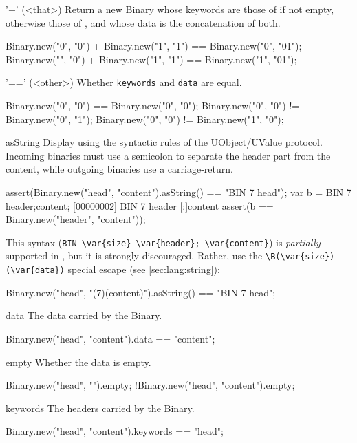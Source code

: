 \begin{urbiscriptapi}
\item['+'](<that>)%
  Return a new Binary whose keywords are those of \this if
  not empty, otherwise those of , and whose data is the
  concatenation of both.
\begin{urbiassert}
Binary.new("0", "0") + Binary.new("1", "1")
       == Binary.new("0", "01");
Binary.new("", "0") + Binary.new("1", "1")
       == Binary.new("1", "01");
\end{urbiassert}


\item['=='](<other>)%
  Whether \lstinline|keywords| and \lstinline|data| are equal.
\begin{urbiassert}
Binary.new("0", "0") == Binary.new("0", "0");
Binary.new("0", "0") != Binary.new("0", "1");
Binary.new("0", "0") != Binary.new("1", "0");
\end{urbiassert}


\item[asString]
  Display using the syntactic rules of the UObject/UValue protocol.
  Incoming binaries must use a semicolon to separate the header part
  from the content, while outgoing binaries use a carriage-return.
\begin{urbiscript}
assert(Binary.new("head", "content").asString()
       == "BIN 7 head\ncontent");
var b = BIN 7 header;content;
[00000002] BIN 7 header
[:]content
assert(b == Binary.new("header", "content"));
\end{urbiscript}

This syntax (\lstinline|BIN \var{size} \var{header}; \var{content}|)
is \emph{partially} supported in \us, but it is strongly discouraged.
Rather, use the \lstinline|\B(\var{size})(\var{data})| special escape
(see \autoref{sec:lang:string}):

\begin{urbiassert}
Binary.new("head", "\B(7)(content)").asString()
       == "BIN 7 head\ncontent";
\end{urbiassert}


\item[data]
  The data carried by the Binary.
\begin{urbiassert}
Binary.new("head", "content").data == "content";
\end{urbiassert}


\item[empty]
  Whether the data is empty.
\begin{urbiassert}
Binary.new("head", "").empty;
!Binary.new("head", "content").empty;
\end{urbiassert}


\item[keywords]
  The headers carried by the Binary.
\begin{urbiassert}
Binary.new("head", "content").keywords == "head";
\end{urbiassert}
\end{urbiscriptapi}


